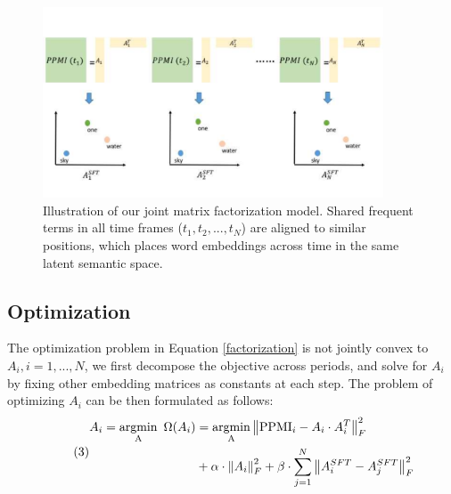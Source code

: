 \documentclass[output=paper]{langsci/langscibook}
\begin{document}

\begin{figure}[ht]
\centering
\includegraphics[width=0.9\textwidth]{figures/DUAN_mf.png}
\caption{Illustration of our joint matrix factorization model. Shared frequent terms in all time frames ($t_{1}, t_{2}, ..., t_{N}$) are aligned to similar positions, which places word embeddings across time in the same latent semantic space.}\label{MF}
\end{figure}

\subsection{Optimization}

The optimization problem in Equation \eqref{factorization} is not jointly convex to $A_{i}, i = 1, ..., N$, we first decompose the objective across periods, and solve for $A_{i}$ by fixing other embedding matrices as constants at each step. The problem of optimizing $A_{i}$ can be then formulated as follows:
\begin{equation}\tag{3}
\begin{aligned}
A_{i} = \operatorname{\underset{A}{argmin}}\ \Omega(A_{i}) &= \operatorname{\underset{A}{argmin}}\left \|\textup{PPMI}_{i} - A_{i}\cdot A_{i}^{T}  \right \|_{F}^{2} \\&+ \alpha \cdot \left \| A_{i} \right \|_{F}^{2} + \beta \cdot \sum_{j = 1}^{N}\left \| A_{i}^{SFT} -  A_{j}^{SFT}\right \|_{F}^{2}
\label{factorization_each_step}
\end{aligned}
\end{equation}
\end{document}

